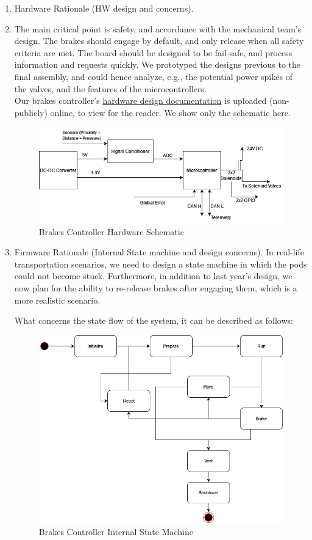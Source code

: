 \begin{enumerate}
\begin{enumerate}
        \item Hardware Rationale (HW design and concerns). \\
        \item The main critical point is safety, and accordance with the mechanical team's design. The brakes should engage by default, and only release when all safety criteria are met. The board should be designed to be fail-safe, and process information and requests quickly. We prototyped the designs previous to the final assembly, and could hence analyze, e.g., the potential power spikes of the valves, and the features of the microcontrollers. \\
        Our brakes controller's \href{https://drive.google.com/file/d/1a7zaJbmfFdLdrrGtLt2_ySVTqbc168NL/}{hardware design documentation} is uploaded (non-publicly) online, to view for the reader. We show only the schematic here. 
        \begin{figure}[H]
            \centering
            \includegraphics[width=0.7\linewidth]{texfiles/elec/eimg/Brakesystems}
            \caption{Brakes Controller Hardware Schematic}
            \label{fig:Brakes Controller Hardware Schematic}
        \end{figure}


        \item Firmware Rationale (Internal State machine and design concerns).
        In real-life transportation scenarios, we need to design a state machine in which the pods could not become stuck. Furthermore, in addition to last year's design, we now plan for the ability to re-release brakes after engaging them, which is a more realistic scenario.


        What concerns the state flow of the system, it can be described as follows:
        \begin{figure}[H]
            \centering
            \includegraphics[width=0.6\linewidth]{texfiles/elec/eimg/BrakesStatechart.png}
            \caption{Brakes Controller Internal State Machine}
            \label{fig:Brakes stateflow}
        \end{figure}


\end{enumerate}
\end{enumerate}
